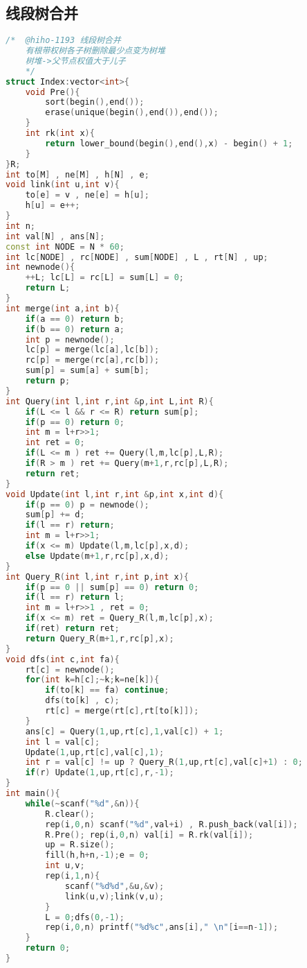 \subsection{线段树合并}
\begin{lstlisting}[language=C++]
/*	@hiho-1193 线段树合并
    有根带权树各子树删除最少点变为树堆
    树堆->父节点权值大于儿子
    */
struct Index:vector<int>{
    void Pre(){
        sort(begin(),end());
        erase(unique(begin(),end()),end());
    }
    int rk(int x){
        return lower_bound(begin(),end(),x) - begin() + 1;
    }
}R;
int to[M] , ne[M] , h[N] , e;
void link(int u,int v){
    to[e] = v , ne[e] = h[u];
    h[u] = e++;
}
int n;
int val[N] , ans[N];
const int NODE = N * 60;
int lc[NODE] , rc[NODE] , sum[NODE] , L , rt[N] , up;
int newnode(){
    ++L; lc[L] = rc[L] = sum[L] = 0;
    return L;
}
int merge(int a,int b){
    if(a == 0) return b;
    if(b == 0) return a;
    int p = newnode();
    lc[p] = merge(lc[a],lc[b]);
    rc[p] = merge(rc[a],rc[b]);
    sum[p] = sum[a] + sum[b];
    return p;
}
int Query(int l,int r,int &p,int L,int R){
    if(L <= l && r <= R) return sum[p];
    if(p == 0) return 0;
    int m = l+r>>1;
    int ret = 0;
    if(L <= m ) ret += Query(l,m,lc[p],L,R);
    if(R > m ) ret += Query(m+1,r,rc[p],L,R);
    return ret;
}
void Update(int l,int r,int &p,int x,int d){
    if(p == 0) p = newnode();
    sum[p] += d;
    if(l == r) return;
    int m = l+r>>1;
    if(x <= m) Update(l,m,lc[p],x,d);
    else Update(m+1,r,rc[p],x,d);
}
int Query_R(int l,int r,int p,int x){
    if(p == 0 || sum[p] == 0) return 0;
    if(l == r) return l;
    int m = l+r>>1 , ret = 0;
    if(x <= m) ret = Query_R(l,m,lc[p],x);
    if(ret) return ret;
    return Query_R(m+1,r,rc[p],x);
}
void dfs(int c,int fa){
    rt[c] = newnode();
    for(int k=h[c];~k;k=ne[k]){
        if(to[k] == fa) continue;
        dfs(to[k] , c);
        rt[c] = merge(rt[c],rt[to[k]]);
    }
    ans[c] = Query(1,up,rt[c],1,val[c]) + 1;
    int l = val[c];
    Update(1,up,rt[c],val[c],1);
    int r = val[c] != up ? Query_R(1,up,rt[c],val[c]+1) : 0;
    if(r) Update(1,up,rt[c],r,-1);
}
int main(){
    while(~scanf("%d",&n)){
        R.clear();
        rep(i,0,n) scanf("%d",val+i) , R.push_back(val[i]);
        R.Pre(); rep(i,0,n) val[i] = R.rk(val[i]);
        up = R.size();
        fill(h,h+n,-1);e = 0;
        int u,v;
        rep(i,1,n){
            scanf("%d%d",&u,&v);
            link(u,v);link(v,u);
        }
        L = 0;dfs(0,-1);
        rep(i,0,n) printf("%d%c",ans[i]," \n"[i==n-1]);
    }
    return 0;
}
\end{lstlisting}
